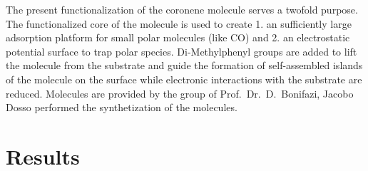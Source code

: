 The present functionalization of the coronene molecule serves a twofold purpose. The functionalized core of the molecule is used to create 1. an sufficiently large adsorption platform for small polar molecules (like CO) and 2. an electrostatic potential surface to trap polar species. 
Di-Methylphenyl groups are added to lift the molecule from the substrate and guide the formation of self-assembled islands of the molecule on the surface while electronic interactions with the substrate are reduced. Molecules are provided by the group of Prof.\ Dr.\ D.\ Bonifazi, Jacobo Dosso performed the synthetization of the molecules. 

\section{Results}
